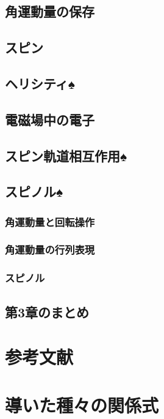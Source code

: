 \documentclass{report}
\begin{document}
    \section{角運動量の保存}
      
    \section{スピン}
      
    \section{ヘリシティ♠}
      
    \section{電磁場中の電子}
      
    \section{スピン軌道相互作用♠}
      
    \section{スピノル♠}
      
      \subsection{角運動量と回転操作}
        
      \subsection{角運動量の行列表現}
        
      \subsection{スピノル}
        
    \section{第3章のまとめ}
      
  \clearpage
  \appendix
  \chapter{参考文献}
    
  \chapter{導いた種々の関係式}
    
\end{document}

